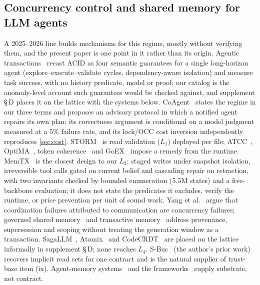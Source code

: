 \subsection{Concurrency control and shared memory for LLM agents}
A 2025--2026 line builds mechanisms for this regime, mostly without verifying
them, and the present paper is one point in it rather than its origin.
Agentic transactions~\cite{SunEtAl2026AgenticTx} recast ACID as four
semantic guarantees for a single long-horizon agent (explore--execute--validate
cycles, dependency-aware isolation) and measure task success, with no history
predicate, model or proof; our catalog is the anomaly-level account such
guarantees would be checked against, and supplement \S\,D places it on the
lattice with the systems below.
CoAgent~\cite{LyuEtAl2026CoAgent} states the regime in our three terms and
proposes an advisory protocol in which a notified agent repairs its own plan;
its correctness argument is conditional on a model judgment measured at a
$5\%$ failure rate, and its lock/OCC cost inversion independently reproduces
\cref{sec:cost}. STORM~\cite{LiuEtAl2026STORM} is read validation ($L_1$)
deployed per file; ATCC~\cite{ZhouEtAl2026ATCC}, OptiMA~\cite{Calikyilmaz2025OptiMA},
token coherence~\cite{Parakhin2026TokenCoherence} and GoEX~\cite{PatilEtAl2024GoEX}
impose a remedy from the runtime. MemTX~\cite{LiEtAl2026MemTX} is the closest
design to our $L_2$: staged writes under snapshot isolation, irreversible
tool calls gated on current belief and cascading repair on retraction, with
two invariants checked by bounded enumeration ($5.5$M states) and a
five-backbone evaluation; it does not state the predicates it excludes,
verify the runtime, or price prevention per unit of sound work. Yang et
al.~\cite{YangEtAl2026Position} argue that coordination failures attributed
to communication are concurrency failures; governed shared
memory~\cite{MargalitEtAl2026Governed} and transactive
memory~\cite{Transactive2026} address provenance, supersession and scoping
without treating the generation window as a transaction. SagaLLM~\cite{GengChang2025SagaLLM}, Atomix~\cite{MohammadiEtAl2026Atomix}
and CodeCRDT~\cite{Pugachev2025CodeCRDT} are placed on the lattice informally
in supplement \S\,D; none reaches $L_4$. S-Bus~\cite{Khan2026SBus} (the
author's prior work) recovers implicit read sets for one contract and is the
natural supplier of trust-base item (ix). Agent-memory systems~\cite{PackerEtAl2023MemGPT} and the
frameworks~\cite{LangGraph2026,WuEtAl2023AutoGen} supply substrate, not
contract.


